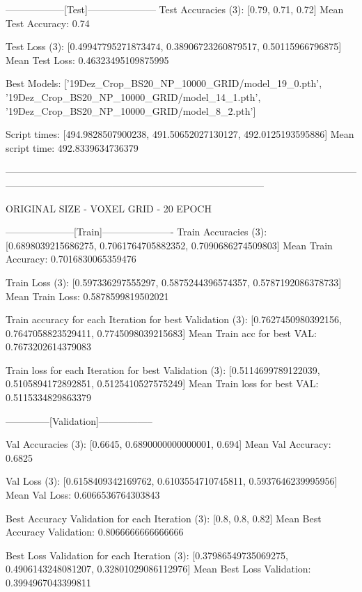 ------------------[Test]---------------------
Test Accuracies (3): 
[0.79, 0.71, 0.72]
Mean Test Accuracy: 0.74

Test Loss (3): 
[0.49947795271873474, 0.38906723260879517, 0.50115966796875]
Mean Test Loss: 0.46323495109875995

Best Models: 
['19Dez_Crop_BS20_NP_10000_GRID/model_19_0.pth', '19Dez_Crop_BS20_NP_10000_GRID/model_14_1.pth', '19Dez_Crop_BS20_NP_10000_GRID/model_8_2.pth']



Script times: [494.9828507900238, 491.50652027130127, 492.0125193595886]
Mean script time: 492.8339634736379









--------------------------------------------------------------------------------------------------------------------------------------------------------------------------------------------

ORIGINAL SIZE - VOXEL GRID - 20 EPOCH

---------------------[Train]----------------------
Train Accuracies (3): 
[0.6898039215686275, 0.7061764705882352, 0.7090686274509803]
Mean Train Accuracy: 0.7016830065359476

Train Loss (3): 
[0.597336297555297, 0.5875244396574357, 0.5787192086378733]
Mean Train Loss: 0.5878599819502021

Train accuracy for each Iteration for best Validation (3): 
[0.7627450980392156, 0.7647058823529411, 0.7745098039215683]
Mean Train acc for best VAL: 0.7673202614379083

Train loss for each Iteration for best Validation (3): 
[0.5114699789122039, 0.5105894172892851, 0.5125410527575249]
Mean Train loss for best VAL: 0.5115334829863379


--------------[Validation]-----------------

Val Accuracies (3): 
[0.6645, 0.6890000000000001, 0.694]
Mean Val Accuracy: 0.6825

Val Loss (3): 
[0.6158409342169762, 0.6103554710745811, 0.5937646239995956]
Mean Val Loss: 0.6066536764303843

Best Accuracy Validation for each Iteration (3): 
[0.8, 0.8, 0.82]
Mean Best Accuracy Validation: 0.8066666666666666

Best Loss Validation for each Iteration (3): 
[0.37986549735069275, 0.4906143248081207, 0.32801029086112976]
Mean Best Loss Validation: 0.3994967043399811



